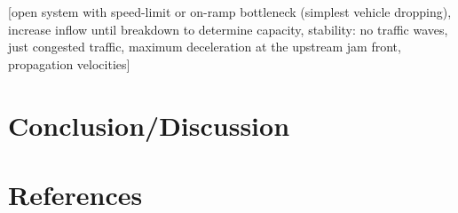 \documentclass[review]{elsarticle}
\begin{document}
[open system with speed-limit or on-ramp bottleneck (simplest vehicle
  dropping), increase inflow until breakdown to determine capacity,
  stability: no traffic waves, just congested traffic, maximum
  deceleration at the upstream jam front, propagation velocities]


\section{Conclusion/Discussion}

\section*{References}


\end{document}

